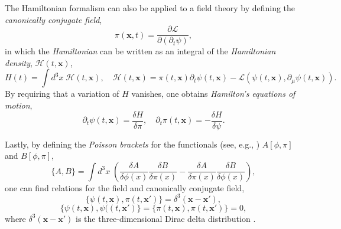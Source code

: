 \documentclass[
12pt,		%
openright,	%
twoside,  %
a4paper,			%
chapter=TITLE,		%
english,			%
french,				%
spanish,			%
brazil				%
]{USPSC-classe/USPSC}
\begin{document}
The Hamiltonian formalism can also be applied to a field theory by defining the \textit{canonically conjugate field},
\begin{equation}
    \pi(\textbf{x},t)=\frac{\partial \mathcal{L}}{\partial(\partial_t{\psi})},
\end{equation}
in which the \textit{Hamiltonian} can be written as an integral of the \textit{Hamiltonian density}, $\mathscr{H}(t,\textbf{x})$,
\begin{equation}
    H(t)=\int d^3x\;\mathscr{H}(t,\textbf{x}),\quad \mathscr{H}(t,\textbf{x})=\pi(t,\textbf{x})\partial_t{\psi}(t,\textbf{x})-\mathcal{L}(\psi(t,\textbf{x}),\partial_{\mu}\psi(t,\textbf{x})).
\end{equation}
By requiring that a variation of $H$ vanishes, one obtains \textit{Hamilton's equations of motion},
\begin{equation}
    \partial_t{\psi}(t,\textbf{x})=\frac{\delta H}{\delta \pi},\quad \partial_t{\pi}(t,\textbf{x})=-\frac{\delta H}{\delta \psi}.
\end{equation}

Lastly, by defining the \textit{Poisson brackets} for the functionals (see, e.g., \cite{Greiner1996}) $A[\phi,\pi]$ and $B[\phi,\pi]$, 
\begin{equation}
    \{A,B\}=\int d^3x\;\left(\frac{\delta A}{\delta\phi(x)}\frac{\delta B}{\delta\pi(x)}-\frac{\delta A}{\delta\pi(x)}\frac{\delta B}{\delta\phi(x)}\right),
\end{equation}
one can find relations for the field and canonically conjugate field,
\begin{equation}
    \{\psi(t,\textbf{x}),\pi(t,\textbf{x}')\}=\delta^3(\textbf{x}-\textbf{x}'),
\end{equation}
\begin{equation}
    \{\psi(t,\textbf{x}),\psi((t,\textbf{x}')\}=\{\pi(t,\textbf{x}),\pi(t,\textbf{x}')\}=0,
\end{equation}
where $\delta^3(\textbf{x}-\textbf{x}')$ is the three-dimensional Dirac delta distribution \cite{Butkov1973}.
\end{document}
